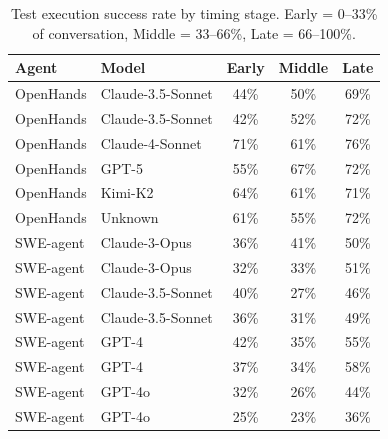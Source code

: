\begin{table}[h]
  \centering
  \small
  \caption{Test execution success rate by timing stage. Early = 0--33\% of conversation, Middle = 33--66\%, Late = 66--100\%.}
  \label{tab:timing-outcome}
  \begin{tabular}{llccc}
    \toprule
    Agent & Model & Early & Middle & Late \\
    \midrule
    OpenHands & Claude-3.5-Sonnet & 44\% & 50\% & 69\% \\
    OpenHands & Claude-3.5-Sonnet & 42\% & 52\% & 72\% \\
    OpenHands & Claude-4-Sonnet & 71\% & 61\% & 76\% \\
    OpenHands & GPT-5 & 55\% & 67\% & 72\% \\
    OpenHands & Kimi-K2 & 64\% & 61\% & 71\% \\
    OpenHands & Unknown & 61\% & 55\% & 72\% \\
    SWE-agent & Claude-3-Opus & 36\% & 41\% & 50\% \\
    SWE-agent & Claude-3-Opus & 32\% & 33\% & 51\% \\
    SWE-agent & Claude-3.5-Sonnet & 40\% & 27\% & 46\% \\
    SWE-agent & Claude-3.5-Sonnet & 36\% & 31\% & 49\% \\
    SWE-agent & GPT-4 & 42\% & 35\% & 55\% \\
    SWE-agent & GPT-4 & 37\% & 34\% & 58\% \\
    SWE-agent & GPT-4o & 32\% & 26\% & 44\% \\
    SWE-agent & GPT-4o & 25\% & 23\% & 36\% \\
    \bottomrule
  \end{tabular}
\end{table}
